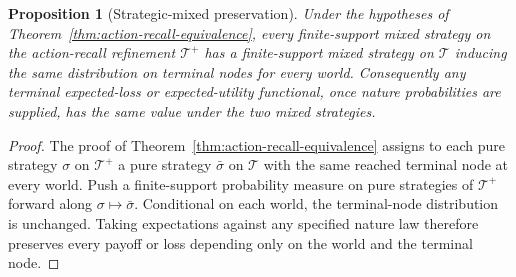 \documentclass[11pt]{article}
\theoremstyle{plain}
\newtheorem{proposition}[theorem]{Proposition}
\theoremstyle{definition}
\theoremstyle{remark}
\begin{document}
\begin{proposition}[Strategic-mixed preservation]
\label{prop:action-recall-mixed-strategic}
Under the hypotheses of Theorem~\ref{thm:action-recall-equivalence}, every
finite-support mixed strategy on the action-recall refinement $\mathcal T^+$ has
a finite-support mixed strategy on $\mathcal T$ inducing the same distribution
on terminal nodes for every world. Consequently any terminal expected-loss or
expected-utility functional, once nature probabilities are supplied, has the same
value under the two mixed strategies.
\end{proposition}

\begin{proof}
The proof of Theorem~\ref{thm:action-recall-equivalence} assigns to each pure
strategy $\sigma$ on $\mathcal T^+$ a pure strategy $\bar\sigma$ on
$\mathcal T$ with the same reached terminal node at every world. Push a
finite-support probability measure on pure strategies of $\mathcal T^+$ forward
along $\sigma\mapsto\bar\sigma$. Conditional on each world, the terminal-node
distribution is unchanged. Taking expectations against any specified nature law
therefore preserves every payoff or loss depending only on the world and the
terminal node.
\end{proof}
\end{document}
